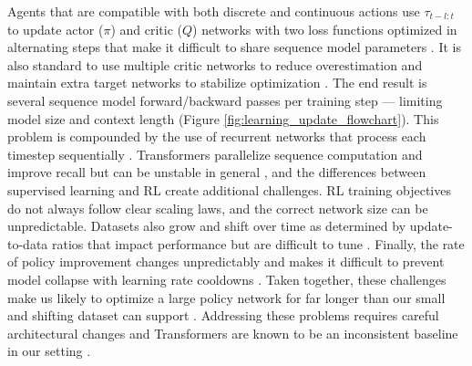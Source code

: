 \documentclass{article}
\begin{document}
Agents that are compatible with both discrete and continuous actions use $\tau_{t-l:t}$ to update actor ($\pi$) and critic ($Q$) networks with two loss functions optimized in alternating steps \cite{lillicrap2015continuous, christodoulou2019soft} that make it difficult to share sequence model parameters \cite{ni2022recurrent, yang2021recurrent, yarats2021improving}. It is also standard to use multiple critic networks to reduce overestimation \cite{fujimoto2018addressing, chen2021randomized} and maintain extra target networks to stabilize optimization \cite{mnih2015human}. The end result is several sequence model forward/backward passes per training step --- limiting model size and context length \cite{pleines2022generalization, ni2022recurrent} (Figure \ref{fig:learning_update_flowchart}). This problem is compounded by the use of recurrent networks that process each timestep sequentially \cite{lu2023structured}. Transformers parallelize sequence computation and improve recall but can be unstable in general \cite{xiong2020layer, nguyen2019transformers}, and the differences between supervised learning and RL create additional challenges. RL training objectives do not always follow clear scaling laws, and the correct network size can be unpredictable. Datasets also grow and shift over time as determined by update-to-data ratios that impact performance but are difficult to tune \cite{fedus2020revisiting, d2022sample}. Finally, the rate of policy improvement changes unpredictably and makes it difficult to prevent model collapse with learning rate cooldowns \cite{vaswani2017attention, touvron2023llama}. Taken together, these challenges make us likely to optimize a large policy network for far longer than our small and shifting dataset can support \cite{nikishin2022primacy, abbas2023loss}. Addressing these problems requires careful architectural changes \cite{melo2022transformers, parisotto2020stabilizing} and Transformers are known to be an inconsistent baseline in our setting \cite{mishra2017simple, laskin2022context, team2023human}.
\vspace{-2mm}
\end{document}

